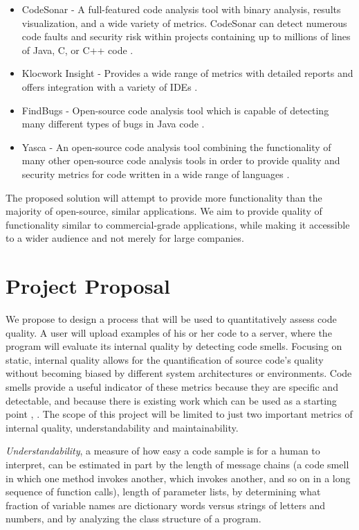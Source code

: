 \documentclass{sig-alternate}
\begin{document}
\begin{itemize}
\item CodeSonar - A full-featured code analysis tool with binary analysis, results visualization, and a wide variety of metrics. CodeSonar can detect numerous code faults and security risk within projects containing up to millions of lines of Java, C, or C++ code \cite{grammatech2013codesonar}.
\item Klocwork Insight - Provides a wide range of metrics with detailed reports and offers integration with a variety of IDEs \cite{klocwork2013insight}.
\item FindBugs - Open-source code analysis tool which is capable of detecting many different types of bugs in Java code \cite{pugh2013findbugs}.
\item Yasca - An open-source code analysis tool combining the functionality of many other open-source code analysis tools in order to provide quality and security metrics for code written in a wide range of languages \cite{scovetta2007yasca}.
\end{itemize}

The proposed solution will attempt to provide more functionality than the majority of open-source, similar applications. We aim to provide quality of functionality similar to commercial-grade applications, while making it accessible to a wider audience and not merely for large companies.

\section{Project Proposal}
\label{sec:project_proposal}
We propose to design a process that will be used to quantitatively assess code quality. A user will upload examples of his or her code to a server, where the program will evaluate its internal quality by detecting code smells. Focusing on static, internal quality allows for the quantification of source code's quality without becoming biased by different system architectures or environments. Code smells provide a useful indicator of these metrics because they are specific and detectable, and because there is existing work which can be used as a starting point \cite{moha2009duchien}, \cite{palomba}.  The scope of this project will be limited to just two important metrics of internal quality, understandability and maintainability. 
	
\emph{Understandability}, a measure of how easy a code sample is for a human to interpret, can be estimated in part by the length of message chains (a code smell in which one method invokes another, which invokes another, and so on in a long sequence of function calls), length of parameter lists, by determining what fraction of variable names are dictionary words versus strings of letters and numbers, and by analyzing the class structure of a program. 
\end{document}
